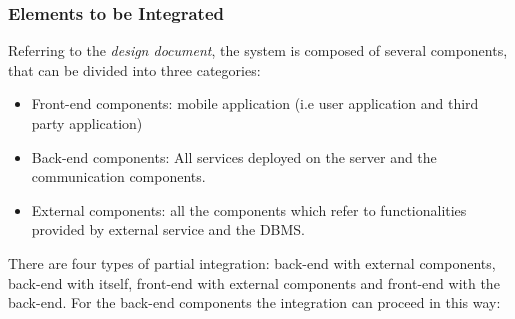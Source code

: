 \subsubsection{Elements to be Integrated}
Referring to the \textit{design document}, the system is composed of several components, that can be divided into three categories: 
\begin{itemize}
\item Front-end components: mobile application (i.e user application and third party application)
\item Back-end components: All services deployed on the server and the communication components.
\item External components: all the components which refer to functionalities provided by external service and the DBMS.
\end{itemize}
There are four types of partial integration: back-end with external components, back-end with itself, front-end with external components and front-end with the back-end. For the back-end components the integration can proceed in this way:
